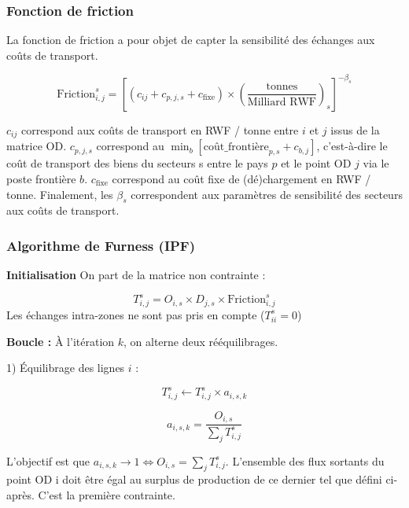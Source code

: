 \documentclass[12pt,a4paper,french]{report}
\begin{document}
	
	\subsubsection{Fonction de friction}
	\label{subsubsec:friction}
	
	La fonction de friction a pour objet de capter la sensibilité des échanges aux coûts de transport.
	
\begin{equation}
		\text{Friction}_{i,j}^s = \left[ (c_{ij} + c_{p,j,s} + c_{\text{fixe}}) \times \left( \frac{\text{tonnes}}{\text{Milliard RWF}} \right)_s \right]^{-\beta_s}
		\label{eq:friction}
\end{equation}
	
	$c_{ij}$ correspond aux coûts de transport en RWF / tonne entre $i$ et $j$ issus de la matrice OD. $c_{p,j,s}$ correspond au $\min_b[\text{coût\_frontière}_{p,s} + c_{b,j}]$, c'est-à-dire le coût de transport des biens du secteurs s entre le pays $p$ et le point OD $j$ via le poste frontière $b$. $c_{\text{fixe}}$ correspond au coût fixe de (dé)chargement en RWF / tonne. Finalement, les $\beta_s$ correspondent aux paramètres de sensibilité des secteurs aux coûts de transport.
	
	\subsubsection{Algorithme de Furness (IPF)}
	\label{subsubsec:furness}
	
	\textbf{Initialisation} On part de la matrice non contrainte :
	
	\begin{equation}
		T_{i,j}^s = O_{i,s} \times D_{j,s} \times \text{Friction}_{i,j}^s
	\end{equation}
	\medskip
	Les échanges intra-zones ne sont pas pris en compte ($T_{ii}^{s} = 0$)
	\medskip
	
	\textbf{Boucle :} À l'itération $k$, on alterne deux rééquilibrages.
	
	1) Équilibrage des lignes $i$ :
	
	\begin{equation}
		T_{i,j}^s \leftarrow T_{i,j}^s \times a_{i,s,k}
	\end{equation}
	
	\begin{equation}
		a_{i,s,k} = \frac{O_{i,s}}{\sum_j T_{i,j}^s}
	\end{equation}
	
	L'objectif est que $a_{i,s,k} \to 1 \iff O_{i,s} = \sum_j T_{i,j}^s$. L'ensemble des flux sortants du point OD i doit être égal au surplus de production de ce dernier tel que défini ci-après. C'est la première contrainte.
	\medskip
	
\end{document}
